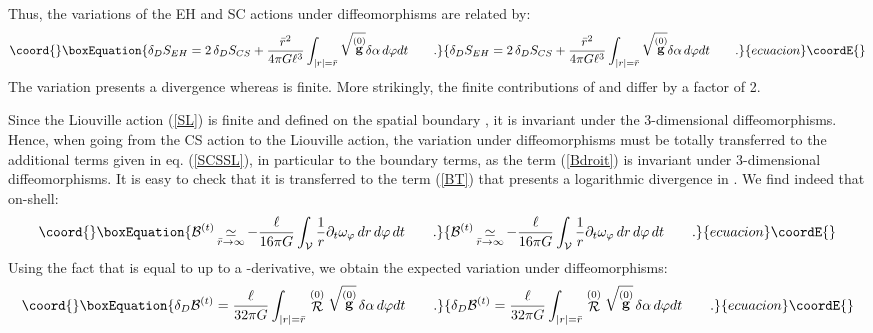 \documentclass[a4paper,10pt]{article}
\begin{document}
Thus, the variations of the EH and SC actions under diffeomorphisms  
are related by:
\begin{equation}\coord{}\boxEquation{
\delta_{D} S_{EH} =  2 \, \delta_{D} S_{CS}
+ \frac {\bar  r^2} {4 \pi G \ell^3}  
\int_{|r|=\bar r} \sqrt{\stackrel {(0)} {\bf g}} \delta \alpha
 \, d\varphi dt \qquad .
}{
\delta_{D} S_{EH} =  2 \, \delta_{D} S_{CS}
+ \frac {\bar  r^2} {4 \pi G \ell^3}  
\int_{|r|=\bar r} \sqrt{\stackrel {(0)} {\bf g}} \delta \alpha
 \, d\varphi dt \qquad .
}{ecuacion}\coordE{}\end{equation}
The variation \coordHE{} presents a \coordHE{} divergence whereas 
\coordHE{} is finite. More strikingly, the finite contributions
of \coordHE{} and \coordHE{}
differ by a factor of 2. 

Since the Liouville action \coordHE{} (\ref{SL}) is finite and defined on the
spatial boundary \coordHE{}, it is invariant 
under the 3-dimensional diffeomorphisms. 
Hence, when going from the CS action to the Liouville action, 
the variation under diffeomorphisms must be totally transferred
to the additional terms given in eq. (\ref{SCSSL}), in particular
to the \coordHE{} boundary terms, 
as the \coordHE{} term (\ref{Bdroit}) is invariant under 3-dimensional 
diffeomorphisms.
It is easy to check that it is transferred to 
the \coordHE{} term (\ref{BT}) that presents a logarithmic divergence 
in \coordHE{}.
We find indeed that on-shell:
\begin{equation}\coord{}\boxEquation{
{\cal B}^{(t)} \asym
 - \frac \ell {16 \pi G} \int_{\cal V} \frac 1 r \partial_t \omega_\varphi 
\, dr \, d\varphi \, dt \qquad .
}{
{\cal B}^{(t)} \asym
 - \frac \ell {16 \pi G} \int_{\cal V} \frac 1 r \partial_t \omega_\varphi 
\, dr \, d\varphi \, dt \qquad .
}{ecuacion}\coordE{}\end{equation}
Using the fact that \coordHE{}
is equal to \coordHE{} up to a \myHighlight{$\varphi$}\coordHE{}-derivative,
we obtain the expected variation under diffeomorphisms:
\begin{equation}\coord{}\boxEquation{
\delta_{D} {\cal B}^{(t)} = 
 \frac \ell {32 \pi G}
\int_{|r|=\bar r} \stackrel {(0)} {\cal R}
 \sqrt{\stackrel {(0)} {\bf g}} \, \delta \alpha
 \, d\varphi dt
\qquad .
}{
\delta_{D} {\cal B}^{(t)} = 
 \frac \ell {32 \pi G}
\int_{|r|=\bar r} \stackrel {(0)} {\cal R}
 \sqrt{\stackrel {(0)} {\bf g}} \, \delta \alpha
 \, d\varphi dt
\qquad .
}{ecuacion}\coordE{}\end{equation}
\end{document}
